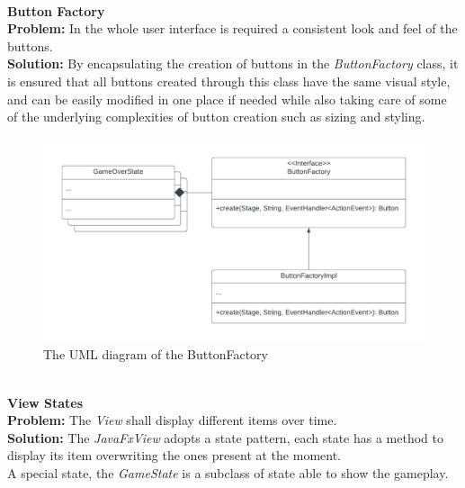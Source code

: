 \documentclass[a4paper,12pt]{report}
\begin{document}
\pagebreak\\
\textbf{Button Factory}\\
\textbf{Problem:} In the whole user interface is required a consistent look and feel of the buttons.\\
\textbf{Solution:} By encapsulating the creation of buttons in the \textit{ButtonFactory} class, it is ensured that all buttons created through this class have the same visual style, and can be easily modified in one place if needed while also taking care of some of the underlying complexities of button creation such as sizing and styling.
\begin{figure}[ht]
	\centering
	\includegraphics[width=\textwidth]{res/ButtonFactory.pdf}
	\caption{The UML diagram of the ButtonFactory}
\end{figure}\\
\textbf{View States}\\
\textbf{Problem:} The \textit{View} shall display different items over time.\\
\textbf{Solution:} The \textit{JavaFxView} adopts a state pattern, each state has a method to display its item overwriting the ones present at the moment.\\
A special state, the \textit{GameState} is a subclass of state able to show the gameplay.
\end{document}
